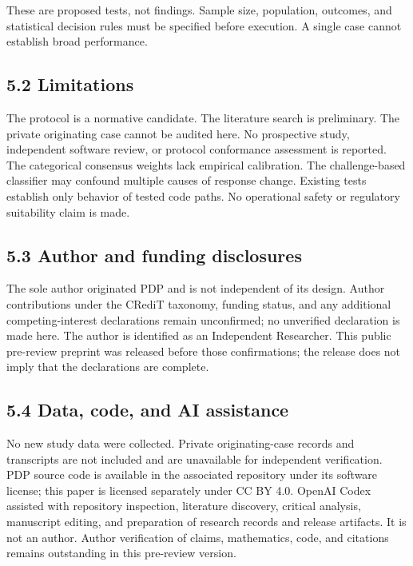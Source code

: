 \documentclass[
  english,
]{article}
\begin{document}
These are proposed tests, not findings. Sample size, population,
outcomes, and statistical decision rules must be specified before
execution. A single case cannot establish broad performance.

\subsection{5.2 Limitations}\label{limitations}

The protocol is a normative candidate. The literature search is
preliminary. The private originating case cannot be audited here. No
prospective study, independent software review, or protocol conformance
assessment is reported. The categorical consensus weights lack empirical
calibration. The challenge-based classifier may confound multiple causes
of response change. Existing tests establish only behavior of tested
code paths. No operational safety or regulatory suitability claim is
made.

\subsection{5.3 Author and funding
disclosures}\label{author-and-funding-disclosures}

The sole author originated PDP and is not independent of its design.
Author contributions under the CRediT taxonomy, funding status, and any
additional competing-interest declarations remain unconfirmed; no
unverified declaration is made here. The author is identified as an
Independent Researcher. This public pre-review preprint was released
before those confirmations; the release does not imply that the
declarations are complete.

\subsection{5.4 Data, code, and AI
assistance}\label{data-code-and-ai-assistance}

No new study data were collected. Private originating-case records and
transcripts are not included and are unavailable for independent
verification. PDP source code is available in the associated repository
under its software license; this paper is licensed separately under CC
BY 4.0. OpenAI Codex assisted with repository inspection, literature
discovery, critical analysis, manuscript editing, and preparation of
research records and release artifacts. It is not an author. Author
verification of claims, mathematics, code, and citations remains
outstanding in this pre-review version.
\end{document}
